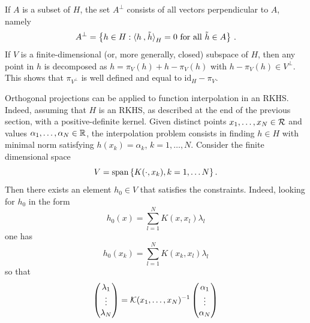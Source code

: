 If $A$ is a subset of $H$, the set $A^\perp$ consists of all vectors perpendicular to $A$, namely
\[
A^\perp = \left\{ h\in H: {\langle {h}\mathbin{,} {\tilde h}\rangle}_H = 0 \text{ for all } \tilde h \in A \right\}\,.
\]
If $V$ is a finite-dimensional  (or, more generally, closed) subspace of $H$, then any point in $h$ is decomposed as $h = \pi_V(h) + h- \pi_V(h)$ with $h-\pi_V(h) \in V^\perp$. This shows that $\pi_{V^\perp}$ is well defined and equal to $\mathrm{id}_H - \pi_V$.

\bigskip

Orthogonal projections can be applied to function interpolation in an RKHS. Indeed, assuming that $H$ is an RKHS, as described at the end of the previous section, with a positive-definite kernel.   Given distinct points $x_1, \ldots, x_N\in {\mathcal R}$ and values $\alpha_1, \ldots, \alpha_N\in {\mathbb{R}}$, the interpolation problem consists in finding $h\in H$ with minimal norm satisfying $h(x_k) = \alpha_k$, $k=1, \ldots, N$. Consider the finite dimensional space
\[
V = \mathrm{span}\left\{ K(\cdot, x_k), k= 1, \ldots N \right\}.
\]
Then there exists an element $h_0\in V$ that satisfies the constraints. Indeed, looking for $h_0$ in the form
\[
h_0(x) = \sum_{l=1}^N K(x, x_l) \lambda_l 
\]
one has
\[
h_0(x_k) = \sum_{l=1}^N K(x_k, x_l) \lambda_l
\]
so that 
\[
\begin{pmatrix}
\lambda_1 \\ \vdots \\ \lambda_N 
\end{pmatrix}
 =
 {\mathcal K}(x_1, \ldots, x_N)^{-1} \begin{pmatrix}
\alpha_1 \\ \vdots \\ \alpha_N 
\end{pmatrix}
 \]
 

